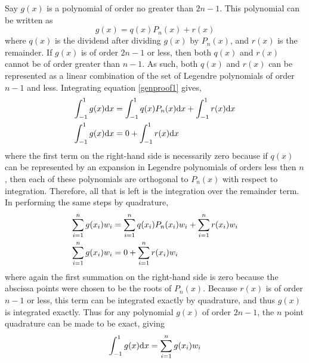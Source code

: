 Say $g(x)$ is a polynomial of order no greater than $2n-1$. This polynomial can be
written as 
\begin{equation}
\label{genproof1}
g(x)=q(x)P_n(x)+r(x)
\end{equation}
where $q(x)$ is the dividend after dividing $g(x)$ by $P_n(x)$, and $r(x)$ is the 
remainder. If $g(x)$ is of order $2n-1$ or less, then both $q(x)$ and $r(x)$ cannot
be of order greater than $n-1$. As such, both $q(x)$ and $r(x)$ can be represented
as a linear combination of the set of Legendre polynomials of order $n-1$ and less. 
Integrating equation \ref{genproof1} gives, 
\begin{align}
\label{genproof2}
\int_{-1}^{1} g(x){\rm d}x &= \int_{-1}^{1} q(x)P_n(x){\rm d}x + \int_{-1}^{1} r(x){\rm d}x \\
\int_{-1}^{1} g(x){\rm d}x &= 0+\int_{-1}^{1} r(x){\rm d}x
\end{align}
where the first term on the right-hand side is necessarily zero because if $q(x)$ 
can be represented by an expansion in Legendre polynomials of orders less then $n$, 
then each of these polynomials are orthogonal to $P_n(x)$ with respect to integration.
Therefore, all that is left is the integration over the remainder term. 
In performing the same steps by quadrature, 
\begin{align}
\label{genproof3}
\sum_{i=1}^{n} g(x_i)w_i &= \sum_{i=1}^{n} q(x_i)P_n(x_i)w_i + \sum_{i=1}^{n} r(x_i)w_i \\
\sum_{i=1}^{n} g(x_i)w_i &= 0+\sum_{i=1}^{n} r(x_i)w_i
\end{align}
where again the first summation on the right-hand side is zero because the 
abscissa points were chosen to be the roots of $P_n(x)$. Because $r(x)$ is of
order $n-1$ or less, this term can be integrated exactly by quadrature, and thus
$g(x)$ is integrated exactly. Thus for any polynomial $g(x)$ of order $2n-1$, 
the $n$ point quadrature can be made to be exact, giving
\begin{equation}
\int_{-1}^{1} g(x){\rm d}x = \sum_{i=1}^{n} g(x_i)w_i
\end{equation}

